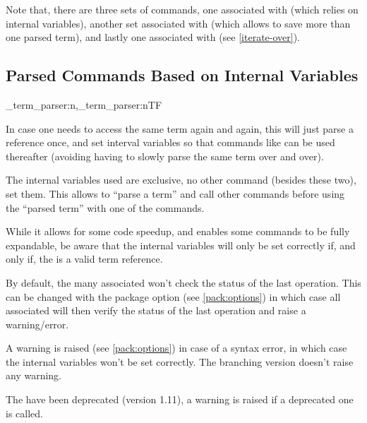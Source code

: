 \documentclass[10pt]{article}
\begin{document}
Note that, there are three sets of  commands, one associated with  (which relies on internal variables), another set associated with   (which allows to save more than one  parsed term), and lastly one associated with  (see \ref{iterate-over}).


\subsection{Parsed Commands Based on Internal Variables}\label{parsed:internal}
\begin{codedescribe}[code,new=2023/05/20,update=2025/10/25]{\starray_term_parser:n,\starray_term_parser:nTF}
\begin{codesyntax}%
\end{codesyntax}
In case one needs to access the same term again and again, this will just parse  a  reference once, and set interval variables so that commands like  can be used thereafter (avoiding having to slowly parse the same term over and over).
\end{codedescribe}
\begin{tsremark}
  The internal variables used are exclusive, no other command (besides these two), set them. This allows to ``parse a term'' and call other \tsobj{\starray_} commands before using the ``parsed term'' with one of the  commands.
\end{tsremark}
\begin{tsremark}
While it allows for some code speedup, and enables some commands to be fully expandable, be aware that the internal variables will only be set correctly if, and only if, the  is a valid term reference.
\end{tsremark}
\begin{tsremark}
  By default, the many associated  won't check the status of the last  operation. This can be changed with the package option  (see \ref{pack:options}) in which case all associated  will then verify the status of the last operation and raise a warning/error.
\end{tsremark}
\begin{tsremark}
A warning is raised (see \ref{pack:options}) in case of a  syntax error, in which case the internal variables won't be set correctly. The branching version doesn't raise any warning.
\end{tsremark}
\begin{tsremark}
The  have been deprecated (version 1.11), a warning is raised if a deprecated one is called.
\end{tsremark}
\end{document}
